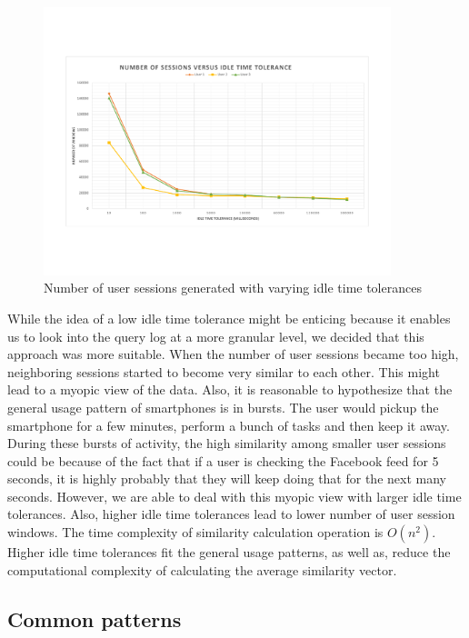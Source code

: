 \begin{figure}[h!]
    \centering
    \includegraphics[width=0.9\textwidth]{graphics/IdleTimeTolerances}
    \caption{Number of user sessions generated with varying idle time tolerances}
    \label{fig:idletime}
\end{figure}

While the idea of a low idle time tolerance might be enticing because it enables us to look into the query log at a more granular level, we decided that this approach was more suitable. When the number of user sessions became too high, neighboring sessions started to become very similar to each other. This might lead to a myopic view of the data. Also, it is reasonable to hypothesize that the general usage pattern of smartphones is in bursts. The user would pickup the smartphone for a few minutes, perform a bunch of tasks and then keep it away. During these bursts of activity, the high similarity among smaller user sessions could be because of the fact that if a user is checking the Facebook feed for 5 seconds, it is highly probably that they will keep doing that for the next many seconds. However, we are able to deal with this myopic view with larger idle time tolerances. Also, higher idle time tolerances lead to lower number of user session windows. The time complexity of similarity calculation operation is $O(n^2)$. Higher idle time tolerances fit the general usage patterns, as well as, reduce the computational complexity of calculating the average similarity vector.

\subsection{Common patterns}

